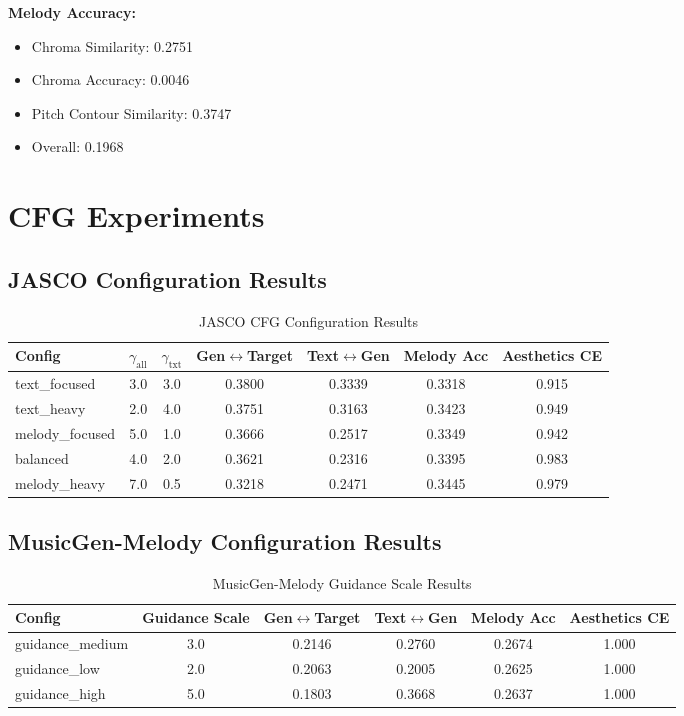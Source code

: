 \documentclass{article}
\begin{document}
\textbf{Melody Accuracy:}
\begin{itemize}
    \item Chroma Similarity: 0.2751
    \item Chroma Accuracy: 0.0046
    \item Pitch Contour Similarity: 0.3747
    \item Overall: 0.1968
\end{itemize}

\section{CFG Experiments}

\subsection{JASCO Configuration Results}

\begin{table}[h]
\centering
\caption{JASCO CFG Configuration Results}
\label{tab:jasco_cfg}
\begin{tabular}{lcccccc}
\toprule
Config & $\gamma_{\text{all}}$ & $\gamma_{\text{txt}}$ & Gen$\leftrightarrow$Target & Text$\leftrightarrow$Gen & Melody Acc & Aesthetics CE \\
\midrule
text\_focused & 3.0 & 3.0 & 0.3800 & 0.3339 & 0.3318 & 0.915 \\
text\_heavy & 2.0 & 4.0 & 0.3751 & 0.3163 & 0.3423 & 0.949 \\
melody\_focused & 5.0 & 1.0 & 0.3666 & 0.2517 & 0.3349 & 0.942 \\
balanced & 4.0 & 2.0 & 0.3621 & 0.2316 & 0.3395 & 0.983 \\
melody\_heavy & 7.0 & 0.5 & 0.3218 & 0.2471 & 0.3445 & 0.979 \\
\bottomrule
\end{tabular}
\end{table}

\subsection{MusicGen-Melody Configuration Results}

\begin{table}[h]
\centering
\caption{MusicGen-Melody Guidance Scale Results}
\label{tab:musicgen_guidance}
\begin{tabular}{lccccc}
\toprule
Config & Guidance Scale & Gen$\leftrightarrow$Target & Text$\leftrightarrow$Gen & Melody Acc & Aesthetics CE \\
\midrule
guidance\_medium & 3.0 & 0.2146 & 0.2760 & 0.2674 & 1.000 \\
guidance\_low & 2.0 & 0.2063 & 0.2005 & 0.2625 & 1.000 \\
guidance\_high & 5.0 & 0.1803 & 0.3668 & 0.2637 & 1.000 \\
\bottomrule
\end{tabular}
\end{table}
\end{document}
